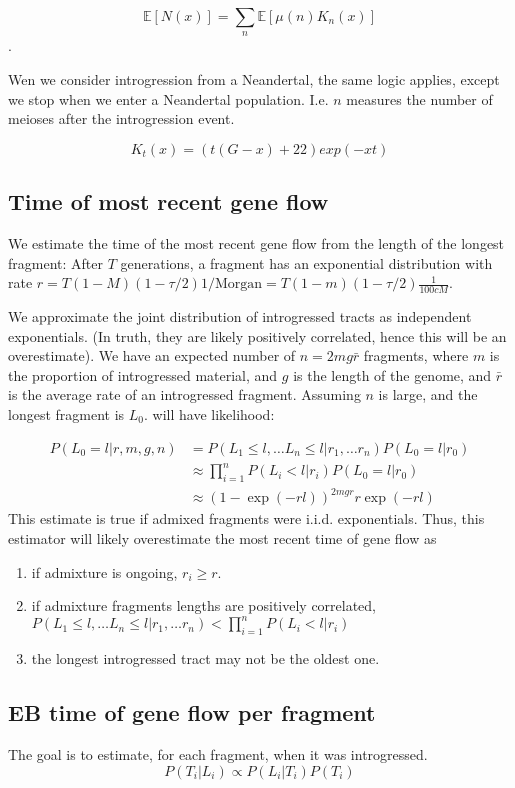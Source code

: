 \documentclass[10pt,a4paper]{article}
\newcommand{\BE}[1]{\mathbb{E}\left[#1\right]}
\begin{document}
$$\BE{N(x)} = \sum_n \BE{\mu(n) K_n (x)}$$.

Wen we consider introgression from a Neandertal, the same logic applies, except we stop when we enter a Neandertal population. I.e. $n$ measures the number of meioses after the introgression event.

$$K_t(x) = (t(G - x) +22) exp(-x t)$$


\subsection{Time of most recent gene flow}
We estimate the time of the most recent gene flow from the length of the longest fragment:
After $T$ generations, a fragment has an exponential distribution with rate $r=T(1-M)(1-\tau/2) 1/\text{Morgan} = T(1-m) (1-\tau/2)\frac{1}{100 cM}$.

We approximate the joint distribution of introgressed tracts as independent exponentials. (In truth, they are likely positively correlated, hence this will be an overestimate). We have an expected number of $n=2mg\bar{r}$ fragments, where $m$ is the proportion of introgressed material, and $g$ is the length of the genome, and $\bar{r}$ is the average rate of an introgressed fragment. Assuming $n$ is large, and the longest fragment is $L_0$. will have likelihood:  

\begin{align}
P(L_0=l | r, m, g, n) 
&= P(L_1 \leq l, \dots L_n \leq l | r_1, \dots r_n) P(L_0 = l | r_0)\nonumber\\
&\approx \prod_{i=1}^n P(L_i < l| r_i) P(L_0 = l | r_0)\nonumber\\
&\approx (1- \exp( -r l ))^{2m g r} r \exp ( -r l)
\end{align}
This estimate is true if admixed fragments were i.i.d. exponentials. Thus, this estimator will likely overestimate the most recent time of gene flow as
\begin{enumerate}
	\item if admixture is ongoing, $r_i \geq r$.
	\item if admixture fragments lengths are positively correlated, $P(L_1 \leq l, \dots L_n \leq l | r_1, \dots r_n) < \prod_{i=1}^n P(L_i < l| r_i)$
	\item the longest introgressed tract may not be the oldest one.
\end{enumerate}

\subsection{EB time of gene flow per fragment}
The goal is to estimate, for each fragment, when it was introgressed.
$$P(T_i | L_i) \propto P(L_i | T_i) P(T_i) $$
\end{document}
